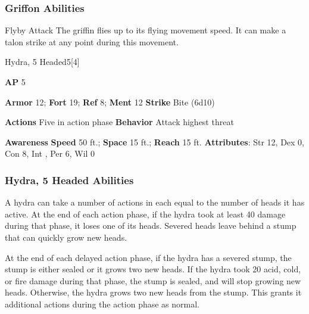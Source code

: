 \subsubsection{Griffon Abilities}

\begin{freeability}{Flyby Attack}
The griffin flies up to its flying movement speed.
It can make a talon strike at any point during this movement.
\end{freeability}

\begin{monsection}{Hydra, 5 Headed}{5}[4]
\vspace{-1em}\vspace{-1em}
\begin{spellcontent}
\begin{spelltargetinginfo}
{\textbf{AP} 5}

\pari \textbf{Armor} 12;
\textbf{Fort} 19;
\textbf{Ref} 8;
\textbf{Ment} 12
\pari \textbf{Strike} Bite  (6d10)


\pari \textbf{Actions} Five in action phase
\pari \textbf{Behavior} Attack highest threat
\end{spelltargetinginfo}
\end{spellcontent}

\begin{monsterfooter}
\pari \textbf{Awareness} 
\pari \textbf{Speed} 50 ft.;
\textbf{Space} 15 ft.;
\textbf{Reach} 15 ft.
\pari \textbf{Attributes}:
Str 12,
Dex 0,
Con 8,
Int ,
Per 6,
Wil 0
\end{monsterfooter}
\end{monsection}


\subsubsection{Hydra, 5 Headed Abilities}

A hydra can take a number of actions in each  equal to the number of heads it has active.
At the end of each action phase, if the hydra took at least 40 damage during that phase, it loses one of its heads.
Severed heads leave behind a stump that can quickly grow new heads.

At the end of each delayed action phase, if the hydra has a severed stump, the stump is either sealed or it grows two new heads.
If the hydra took 20 acid, cold, or fire damage during that phase, the stump is sealed, and will stop growing new heads.
Otherwise, the hydra grows two new heads from the stump.
This grants it additional actions during the action phase as normal.

